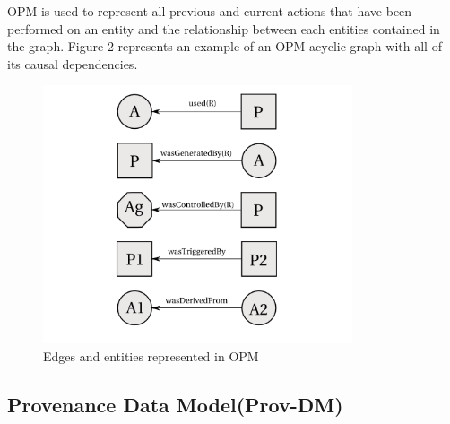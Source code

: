 OPM is used to represent all previous and current actions that have been performed on an entity and  the relationship between each entities contained in the graph. Figure 2 represents an example of an OPM acyclic graph with all of its causal dependencies.  

\begin{figure}[h]
\begin{center}
\includegraphics[height=3.0in]{opm_convention.PNG}
\end{center}
\caption{Edges and entities represented in OPM}
\label{autom}
\end{figure}



\subsection{Provenance Data Model(Prov-DM)}

